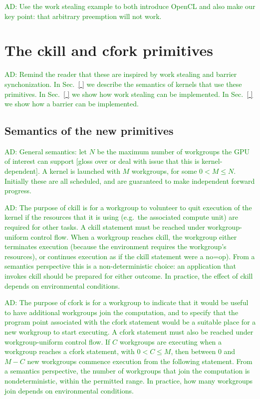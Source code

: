 \documentclass[nocopyrightspace]{sigplanconf-pldi16}
\newcommand{\ADComment}[1]{\textcolor{green}{AD: #1}}
\newcommand{\mysec}{Sec.~}
\begin{document}
\ADComment{Use the work stealing example to both introduce OpenCL and
  also make our key point: that arbitrary preemption will not work.}


\section{The ckill and cfork primitives}

\ADComment{Remind the reader that these are inspired by work stealing
  and barrier synchonization.  In \mysec\ref{ } we describe the
  semantics of kernels that use these primitives.  In \mysec\ref{ } we
  show how work stealing can be implemented.  In \mysec\ref{ } we show
  how a barrier can be implemented.}

\subsection{Semantics of the new primitives}

\ADComment{General semantics: let $N$ be the maximum number of
  workgroups the GPU of interest can support [gloss over or deal with
    issue that this is kernel-dependent].  A kernel is launched with
  $M$ workgroups, for some $0 < M \leq N$.  Initially these are all
  scheduled, and are guaranteed to make independent forward progress.}

\ADComment{The purpose of ckill is for a workgroup to volunteer to
  quit execution of the kernel if the resources that it is using
  (e.g.\ the associated compute unit) are required for other tasks.  A
  ckill statement must be reached under workgroup-uniform control
  flow.  When a workgroup reaches ckill, the workgroup either
  terminates execution (because the environment requires the
  workgroup's resources), or continues execution as if the ckill
  statement were a no=op).  From a semantics perspective this is a
  non-deterministic choice: an application that invokes ckill should
  be prepared for either outcome.  In practice, the effect of ckill
  depends on environmental conditions.}

\ADComment{The purpose of cfork is for a workgroup to indicate that it
  would be useful to have additional workgroups join the computation,
  and to specify that the program point associated with the cfork
  statement would be a suitable place for a new workgroup to start
  executing.  A cfork statement must also be reached under
  workgroup-uniform control flow.  If $C$ workgroups are executing
  when a workgroup reaches a cfork statement, with $0 < C \leq M$,
  then between 0 and $M-C$ new workgroups commence execution from the
  following statement.  From a semantics perspective, the number of
  workgroups that join the computation is nondeterministic, within the
  permitted range.  In practice, how many workgroups join depends on
  environmental conditions.}
\end{document}
